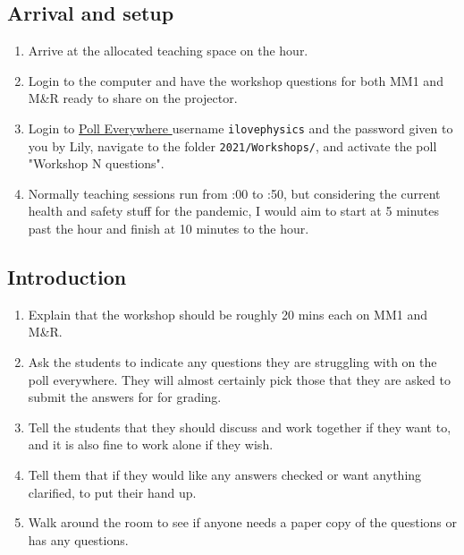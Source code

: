 \documentclass[11.5pt,sans,english]{article}
\begin{document}
\subsection{Arrival and setup}
\begin{enumerate}
\item Arrive at the allocated teaching space on the hour.
\item Login to the computer and have the workshop questions for both MM1 and M\&R ready to share on the projector.
\item Login to \href{https://www.polleverywhere.com}{Poll Everywhere }  username \texttt{ilovephysics} and the password given to you by Lily, navigate to the folder \texttt{2021/Workshops/}, and activate the poll "Workshop N questions".
\item Normally teaching sessions run from :00 to :50, but considering the current health and safety stuff for the pandemic, I would aim to start at 5 minutes past the hour and finish at 10 minutes to the hour.
\end{enumerate}

\subsection{Introduction}
\begin{enumerate}
\item Explain that the workshop should be roughly 20 mins each on MM1 and M\&R.
\item Ask the students to indicate any questions they are struggling with on the poll everywhere. They will almost certainly pick those that they are asked to submit the answers for for grading.
\item Tell the students that they should discuss and work together if they want to, and it is also fine to work alone if they wish.
\item Tell them that if they would like any answers checked or want anything clarified, to put their hand up.
\item Walk around the room to see if anyone needs a paper copy of the questions or has any questions.
\end{enumerate}
\end{document}
